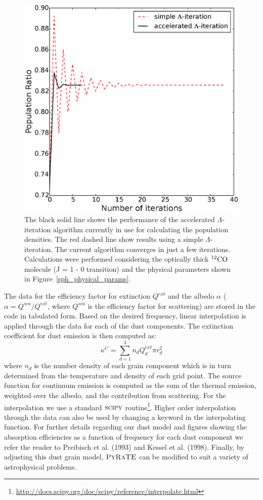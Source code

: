 \documentclass{mn2e}
\begin{document}
\begin{figure}
\includegraphics[width=1.0\columnwidth, clip]{performance.eps}
\caption{The black solid line shows the performance of the accelerated $\Lambda$-iteration algorithm currently in use for calculating the population densities. The red dashed line show results using a simple $\Lambda$-iteration. The current algorithm converges in just a few iterations. Calculations were performed considering the optically thick $\rm{^{12}CO}$ molecule (J = 1 - 0 transition) and the physical parameters shown in Figure~\ref{sph_physical_params}.
\label{performance}}
\end{figure}

The data for the efficiency factor for extinction $Q^{ext}$ and the albedo $\alpha$ ($\alpha = Q^{sca}/Q^{ext}$, where $Q^{sca}$ is the efficiency factor for scattering) are stored in the code in tabulated form. Based on the desired frequency, linear interpolation is applied through the data for each of the dust components. The extinction coefficient for dust emission is then computed as:
\begin{equation}
\kappa^C=\sum\limits_{d=1}^3 n_dQ_d^{ext}\pi r_d^2
\end{equation}
where $n_d$ is the number density of each grain component which is in turn determined from the temperature and density of each grid point. The source function for continuum emission is computed as the sum of the thermal emission, weighted over the albedo, and the contribution from scattering. For the interpolation we use a standard $\textsc{scipy}$ routine\footnote{\url{http://docs.scipy.org/doc/scipy/reference/interpolate.html}}. Higher order interpolation through the data can also be used by changing a keyword in the interpolating function. For further details regarding our dust model and figures showing the absorption efficiencies as a function of frequency for each dust component we refer the reader to Preibisch et al. (1993) and Kessel et al. (1998). Finally, by adjusting this dust grain model, $\textsc{PyRaTE}$ can be modified to suit a variety of astrophysical problems.
\end{document}

